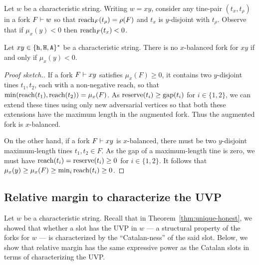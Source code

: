 Let $w$ be a characteristic string. 
Writing $w = xy$, 
consider any tine-pair $(t_x, t_\rho)$ in a fork $F \vdash w$ so that 
$\operatorname{reach}_F(t_\rho) = \rho(F)$ and $t_x$ is $y$-disjoint with $t_\rho$.
Observe that if $\mu_x(y) < 0$ then $\operatorname{reach}_F(t_x) < 0$. 

\begin{fact}\label{fact:margin-balance}
  Let $xy \in \{\mathtt{h}, \mathtt{H}, \mathtt{A}\}^*$ be a characteristic string. 
  There is no 
  $x$-balanced fork for $xy$ 
  if and only if 
  $\mu_x(y) < 0$.
\end{fact}
\begin{proof}[Proof sketch.]  
  If a fork $F \vdash xy$ 
  satisfies $\mu_x(F) \geq 0$, 
  it contains two $y$-disjoint tines $t_1, t_2$, 
  each with a non-negative reach, 
  so that $\min(\operatorname{reach}(t_1), \operatorname{reach}(t_2)) = \mu_x(F)$. 
  As $\operatorname{reserve}(t_i) \geq \operatorname{gap}(t_i)$ for $i \in \{1,2\}$, 
  we can extend these tines using only new adversarial vertices 
  so that both these extensions 
  have the maximum length 
  in the augmented fork. 
  Thus the augmented fork is $x$-balanced.

  On the other hand, if a fork $F \vdash xy$ is $x$-balanced, 
  there must be two $y$-disjoint 
  maximum-length tines $t_1, t_2 \in F$. 
  As the gap of a maximum-length tine is zero, 
  we must have $\operatorname{reach}(t_i) = \operatorname{reserve}(t_i) \geq 0$ 
  for $i \in \{1, 2\}$. 
  It follows that $\mu_x(y) \geq \mu_x(F) \geq \min_i \operatorname{reach}(t_i) \geq 0$.
\end{proof}



\subsection{Relative margin 
to characterize 
the UVP}
Let $w$ be a characteristic string. 
Recall that in Theorem~\ref{thm:unique-honest}, 
we showed that whether a slot has the UVP in $w$ --- a 
structural property of the forks for $w$ --- is 
characterized by the ``Catalan-ness'' of the said slot. 
Below, we show that relative margin 
has the same expressive power 
as the Catalan slots 
in terms of characterizing the UVP. 


